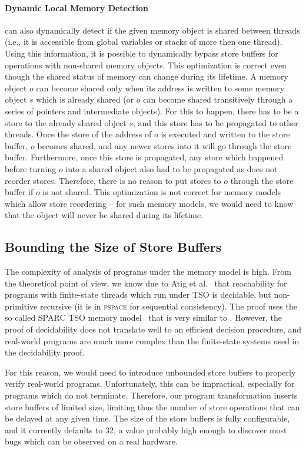 \paragraph{Dynamic Local Memory Detection}
\divine can also dynamically detect if the given memory object is shared between threads (i.e., it is accessible from global variables or stacks of more then one thread).
Using this information, it is possible to dynamically bypass store buffers for operations with non-shared memory objects.
This optimization is correct even though the shared status of memory can change during its lifetime.
A memory object $o$ can become shared only when its address is written to some memory object $s$ which is already shared (or $o$ can become shared transitively through a series of pointers and intermediate objects).
For this to happen, there has to be a store to the already shared object $s$, and this store has to be propagated to other threads.
Once the store of the address of $o$ is executed and written to the store buffer, $o$ becomes shared, and any newer stores into it will go through the store buffer.
Furthermore, once this store is propagated, any store which happened before turning $o$ into a shared object also had to be propagated as \xtso does not reorder stores.
Therefore, there is no reason to put stores to $o$ through the store buffer if $o$ is not shared.
This optimization is not correct for memory models which allow store reordering -- for such memory models, we would need to know that the object will never be shared during its lifetime.

\subsection{Bounding the Size of Store Buffers}

The complexity of analysis of programs under the \xtso memory model is high.
From the theoretical point of view, we know due to Atig et al.~ that reachability for programs with finite-state threads which run under TSO is decidable, but non-primitive recursive (it is in \textsc{pspace} for sequential consistency).
The proof uses the so called SPARC TSO memory model~ that is very similar to \xtso. However, the proof of decidability does not translate well to an efficient decision procedure, and real-world programs are much more complex than the finite-state systems used in the decidability proof.

For this reason, we would need to introduce unbounded store buffers to properly
verify real-world programs. Unfortunately, this can be impractical, especially for programs which do not terminate.
Therefore, our program transformation
inserts store buffers of limited size, limiting thus the number of store
operations that can be delayed at any given time. The
size of the store buffers is fully configurable, and it currently defaults to
32, a value probably high enough to discover most bugs which can be observed on
a real hardware.

